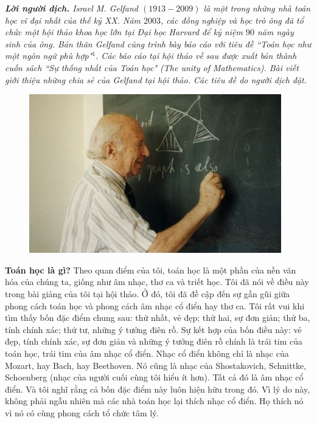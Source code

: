 \textit{\textbf{\color{quantoan}Lời người dịch.} Israel M. Gelfand $(1913-2009)$ là một trong những nhà toán học vĩ đại nhất của thế kỷ XX. Năm $2003$, các đồng nghiệp và học trò ông đã tổ chức một hội thảo khoa học lớn tại Đại học Harvard để kỷ niệm $90$ năm ngày sinh của ông. Bản thân Gelfand cũng trình bày báo cáo với tiêu đề ``Toán học như một ngôn ngữ phù hợp"$^1$. Các báo cáo tại hội thảo về sau được xuất bản thành cuốn sách ``Sự  thống nhất của Toán học" (The unity of Mathematics). Bài viết giới thiệu những chia sẻ của Gelfand tại hội thảo. Các tiêu đề do người dịch đặt.}
\begin{multicols}{2}
	\begin{figure}[H]
		\vspace*{5pt}
		\centering
		\captionsetup{labelformat= empty, justification=centering}
		\includegraphics[width= 1\linewidth]{gelfand_blackboard}
		\vspace*{-20pt}
	\end{figure}
	\textbf{\color{quantoan}Toán học là gì?}
	\vskip 0.1cm
	Theo quan điểm của tôi, toán học là một phần của nền văn hóa của chúng ta, giống như âm nhạc, thơ ca và triết học. Tôi đã nói về điều này trong bài giảng của tôi tại hội thảo. Ở đó, tôi đã đề cập đến sự gần gũi giữa phong cách toán học và phong cách âm nhạc cổ điển hay thơ ca. Tôi rất vui khi tìm thấy bốn đặc điểm chung sau: thứ nhất, vẻ đẹp; thứ hai, sự đơn giản; thứ ba, tính chính xác; thứ tư, những ý tưởng điên rồ. Sự kết hợp của bốn điều này: vẻ đẹp, tính chính xác, sự đơn giản và những ý tưởng điên rồ chính là trái tim của toán học, trái tim của âm nhạc cổ điển. Nhạc cổ điển không chỉ là nhạc của Mozart, hay Bach, hay Beethoven. Nó cũng là nhạc của Shostakovich, Schnittke, Schoenberg (nhạc của người cuối cùng tôi hiểu ít hơn). Tất cả đó là âm nhạc cổ điển. Và tôi nghĩ rằng cả bốn đặc điểm này luôn hiện hữu trong đó. Vì lý do này, không phải ngẫu nhiên mà các nhà toán học lại thích nhạc cổ điển. Họ thích nó vì nó có cùng phong cách tổ chức tâm lý.

\end{multicols}
